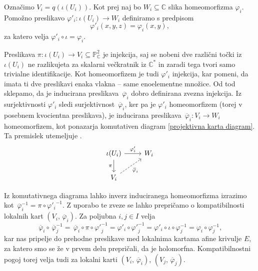 \documentclass[mat1]{fmfdelo}
\numberwithin{equation}{section}
\newcommand{\C}{\mathbb C}
\newcommand{\CM}{\mathbb C ^*}
\newcommand{\PC}{\mathbb{P}^2_\C}
\newcommand{\inv}{^{-1}}
\newcommand{\olsi}[1]{\,\overline{\!{#1}}} %
\theoremstyle{definition}
\begin{document}
Označimo $V_i = q(\iota(U_i))$. Kot prej naj bo $W_i \subseteq \C$ slika homeomorfizma $\varphi_i$. Pomožno preslikavo $\varphi'_i : \iota(U_i) \to W_i$ definiramo s predpisom 
\[
    \varphi'_i(x,y,z) = \varphi_i(x,y),
\]
za katero velja $\varphi'_i \circ \iota = \varphi_i$.

Preslikava $\pi: \iota(U_i) \to V_i \subseteq \PC$ je injekcija, saj se nobeni dve različni točki iz $\iota(U_i)$ ne razlikujeta za skalarni večkratnik iz $\CM$ in zaradi tega tvori samo trivialne identifikacije. Kot homeomorfizem je tudi $\varphi'_i$ injekcija, kar pomeni, da imata ti dve preslikavi enaka vlakna -- same enoelementne množice. Od tod sklepamo, da je inducirana preslikava $\olsi{\varphi}_i$ dobro definirana zvezna injekcija. Iz surjektivnosti $\varphi'_i$ sledi surjektivnost $\olsi{\varphi}_i$, ker pa je $\varphi'_i$ homeomorfizem (torej v posebnem kvocientna preslikava), je inducirana preslikava $\olsi{\varphi}_i : V_i \to W_i$ homeomorfizem, kot ponazarja komutativen diagram \eqref{projektivna karta diagram}. Ta premislek utemeljuje \cite[posledica 3.23]{MrcunTop}.
%
%
\begin{equation}
    \label{projektivna karta diagram}    
    \begin{tikzcd}
	{\iota(U_i)} & {W_i} \\
	{V_i}
	\arrow["{\varphi'_i}", from=1-1, to=1-2]
	\arrow["\pi"', from=1-1, to=2-1]
	\arrow["{\olsi{\varphi}_i}"', dashed, from=2-1, to=1-2]
    \end{tikzcd}
\end{equation}


Iz komutativnega diagrama lahko inverz induciranega homeomorfizma izrazimo kot $\olsi{\varphi}_i\inv = \pi \circ {\varphi'_i}\inv$. Z uporabo te zveze se lahko prepričamo o kompatibilnosti lokalnih kart
$(V_i, \olsi{\varphi}_i)$.
Za poljubna $i,j \in I$ velja
\[
    \olsi{\varphi}_i \circ \olsi{\varphi}_j\inv = 
    \olsi{\varphi}_i \circ \pi \circ {\varphi'}_j\inv = 
    \varphi'_i \circ {\varphi'}_j\inv = 
    \varphi'_i \circ \iota \circ \varphi_j\inv = 
    \varphi_i \circ \varphi_j\inv,
\]
kar nas pripelje do prehodne preslikave med lokalnima kartama afine krivulje $E$, za katero smo se že v prvem delu prepričali, da je holomorfna. Kompatibilnostni pogoj torej velja tudi za lokalni karti $(V_i, \olsi{\varphi}_i)$, $(V_j, \olsi{\varphi}_j)$.
\end{document}
